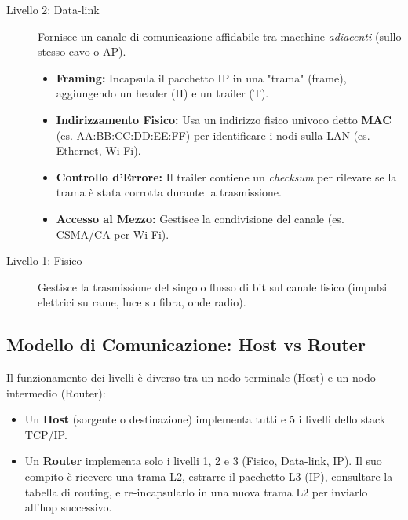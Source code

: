 \documentclass[../main.tex]{subfiles}
\begin{document}
\begin{description}
    \item[Livello 2: Data-link]
    Fornisce un canale di comunicazione affidabile tra macchine \emph{adiacenti} (sullo stesso cavo o AP).
    \begin{itemize}
        \item \textbf{Framing:} Incapsula il pacchetto IP in una "trama" (frame), aggiungendo un header (H) e un trailer (T).
        \item \textbf{Indirizzamento Fisico:} Usa un indirizzo fisico univoco detto \textbf{MAC} (es. AA:BB:CC:DD:EE:FF) per identificare i nodi sulla LAN (es. Ethernet, Wi-Fi).
        \item \textbf{Controllo d'Errore:} Il trailer contiene un \emph{checksum} per rilevare se la trama è stata corrotta durante la trasmissione.
        \item \textbf{Accesso al Mezzo:} Gestisce la condivisione del canale (es. CSMA/CA per Wi-Fi).
    \end{itemize}

    \item[Livello 1: Fisico]
    Gestisce la trasmissione del singolo flusso di bit sul canale fisico (impulsi elettrici su rame, luce su fibra, onde radio).
\end{description}

\subsection{Modello di Comunicazione: Host vs Router}
Il funzionamento dei livelli è diverso tra un nodo terminale (Host) e un nodo intermedio (Router):
\begin{itemize}
    \item Un \textbf{Host} (sorgente o destinazione) implementa tutti e 5 i livelli dello stack TCP/IP.
    \item Un \textbf{Router} implementa solo i livelli 1, 2 e 3 (Fisico, Data-link, IP). Il suo compito è ricevere una trama L2, estrarre il pacchetto L3 (IP), consultare la tabella di routing, e re-incapsularlo in una nuova trama L2 per inviarlo all'hop successivo.
\end{itemize}

\end{document}
